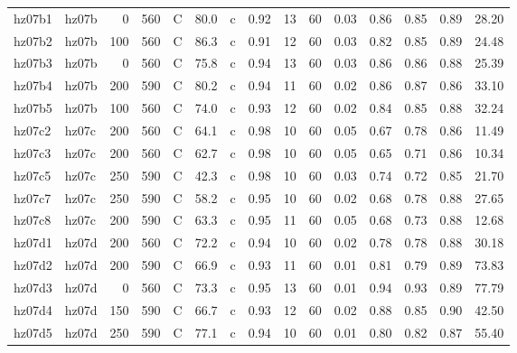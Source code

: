 \documentclass{article}
\begin{document}
\begin{landscape}
\begin{longtable}{llrrlrlrrrrrrrr}
      hz07b1 &      hz07b &    0 &  560 &     C &    80.0 &   c &  0.92 &  13 &         60 &  0.03 &  0.86 &  0.85 &  0.89 &   28.20 \\
      hz07b2 &      hz07b &  100 &  560 &     C &    86.3 &   c &  0.91 &  12 &         60 &  0.03 &  0.82 &  0.85 &  0.89 &   24.48 \\
      hz07b3 &      hz07b &    0 &  560 &     C &    75.8 &   c &  0.94 &  13 &         60 &  0.03 &  0.86 &  0.86 &  0.88 &   25.39 \\
      hz07b4 &      hz07b &  200 &  590 &     C &    80.2 &   c &  0.94 &  11 &         60 &  0.02 &  0.86 &  0.87 &  0.86 &   33.10 \\
      hz07b5 &      hz07b &  100 &  560 &     C &    74.0 &   c &  0.93 &  12 &         60 &  0.02 &  0.84 &  0.85 &  0.88 &   32.24 \\
      hz07c2 &      hz07c &  200 &  560 &     C &    64.1 &   c &  0.98 &  10 &         60 &  0.05 &  0.67 &  0.78 &  0.86 &   11.49 \\
      hz07c3 &      hz07c &  200 &  560 &     C &    62.7 &   c &  0.98 &  10 &         60 &  0.05 &  0.65 &  0.71 &  0.86 &   10.34 \\
      hz07c5 &      hz07c &  250 &  590 &     C &    42.3 &   c &  0.98 &  10 &         60 &  0.03 &  0.74 &  0.72 &  0.85 &   21.70 \\
      hz07c7 &      hz07c &  250 &  590 &     C &    58.2 &   c &  0.95 &  10 &         60 &  0.02 &  0.68 &  0.78 &  0.88 &   27.65 \\
      hz07c8 &      hz07c &  200 &  590 &     C &    63.3 &   c &  0.95 &  11 &         60 &  0.05 &  0.68 &  0.73 &  0.88 &   12.68 \\
      hz07d1 &      hz07d &  200 &  560 &     C &    72.2 &   c &  0.94 &  10 &         60 &  0.02 &  0.78 &  0.78 &  0.88 &   30.18 \\
      hz07d2 &      hz07d &  200 &  590 &     C &    66.9 &   c &  0.93 &  11 &         60 &  0.01 &  0.81 &  0.79 &  0.89 &   73.83 \\
      hz07d3 &      hz07d &    0 &  560 &     C &    73.3 &   c &  0.95 &  13 &         60 &  0.01 &  0.94 &  0.93 &  0.89 &   77.79 \\
      hz07d4 &      hz07d &  150 &  590 &     C &    66.7 &   c &  0.93 &  12 &         60 &  0.02 &  0.88 &  0.85 &  0.90 &   42.50 \\
      hz07d5 &      hz07d &  250 &  590 &     C &    77.1 &   c &  0.94 &  10 &         60 &  0.01 &  0.80 &  0.82 &  0.87 &   55.40 \\

\end{longtable}
\end{landscape}
\end{document}
